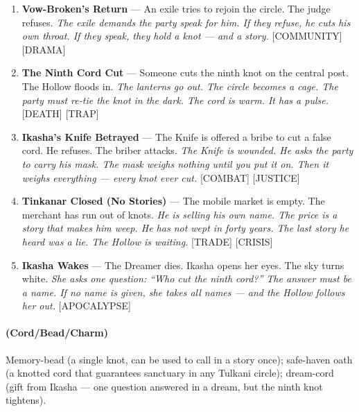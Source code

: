 \begin{enumerate}
  \hfill \textit{The guard demands a truth instead. The truth must be a secret. The secret must hurt. The guard will remember --- and the Hollow will too.} [TRAVEL] [SOCIAL]
\item \textbf{Vow-Broken's Return} --- An exile tries to rejoin the circle. The judge refuses.
  \hfill \textit{The exile demands the party speak for him. If they refuse, he cuts his own throat. If they speak, they hold a knot --- and a story.} [COMMUNITY] [DRAMA]
\item[J] \textbf{The Ninth Cord Cut} --- Someone cuts the ninth knot on the central post. The Hollow floods in.
  \hfill \textit{The lanterns go out. The circle becomes a cage. The party must re-tie the knot in the dark. The cord is warm. It has a pulse.} [DEATH] [TRAP]
\item[Q] \textbf{Ikasha's Knife Betrayed} --- The Knife is offered a bribe to cut a false cord. He refuses. The briber attacks.
  \hfill \textit{The Knife is wounded. He asks the party to carry his mask. The mask weighs nothing until you put it on. Then it weighs everything --- every knot ever cut.} [COMBAT] [JUSTICE]
\item[K] \textbf{Tinkanar Closed (No Stories)} --- The mobile market is empty. The merchant has run out of knots.
  \hfill \textit{He is selling his own name. The price is a story that makes him weep. He has not wept in forty years. The last story he heard was a lie. The Hollow is waiting.} [TRADE] [CRISIS]
\item[A] \textbf{Ikasha Wakes} --- The Dreamer dies. Ikasha opens her eyes. The sky turns white.
  \hfill \textit{She asks one question: ``Who cut the ninth cord?'' The answer must be a name. If no name is given, she takes all names --- and the Hollow follows her out.} [APOCALYPSE]
\end{enumerate}

\paragraph*{(Cord/Bead/Charm)} Memory-bead (a single knot, can be used to call in a story once); safe-haven oath (a knotted cord that guarantees sanctuary in any Tulkani circle); dream-cord (gift from Ikasha --- one question answered in a dream, but the ninth knot tightens).

